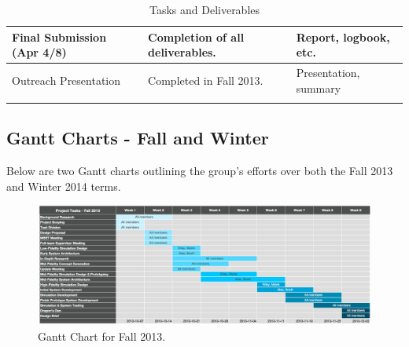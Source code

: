 \documentclass{report}
\begin{document}
\begin{longtable}{|p{4.5cm}|p{6cm}|p{4.5cm}|}
    Final Submission (Apr 4/8)                        & Completion of all deliverables.                                                                                                                                                                                                    & Report, logbook, etc.                 \\ \hline
    Outreach Presentation                             & Completed in Fall 2013.                                                                                                                                                                                                            & Presentation, summary                 \\ \hline
\caption{Tasks and Deliverables}
\label{table:tasks-deliverables}
\end{longtable}

\subsection{Gantt Charts - Fall and Winter}
 Below are two Gantt charts outlining the group's efforts over both the Fall 2013 and Winter 2014 terms.

\begin{figure}[H]
\centering
\includegraphics[scale=0.22, angle = 90]{figures/gantt-fall.png}
\caption{Gantt Chart for Fall 2013.}
\label{fig:gantt-fall}
\end{figure}

\newpage
\end{document}

